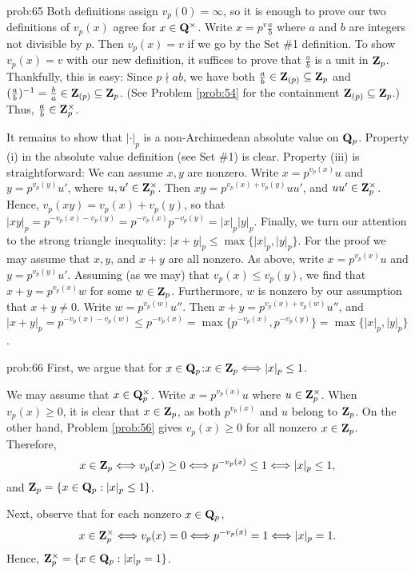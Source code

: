 \begin{sol}{prob:65} Both definitions assign $v_p(0)=\infty$, so it is enough to prove our two definitions of $v_p(x)$ agree for $x \in \mathbf{Q}^{\times}$. Write $x = p^{v} \frac{a}{b}$ where $a$ and $b$ are integers not divisible by $p$. Then $v_p(x)=v$ if we go by the Set \#1 definition. To show $v_p(x)=v$ with our new definition, it suffices to prove that $\frac{a}{b}$ is a unit in $\mathbf{Z}_p$. Thankfully, this is easy: Since $p\nmid ab$, we have both $\frac{a}{b} \in \mathbf{Z}_{(p)} \subseteq \mathbf{Z}_p$ and $(\frac{a}{b})^{-1} = \frac{b}{a} \in \mathbf{Z}_{(p)} \subseteq \mathbf{Z}_p$. (See Problem \ref{prob:54} for the containment $\mathbf{Z}_{(p)}\subseteq \mathbf{Z}_p$.) Thus, $\frac{a}{b} \in \mathbf{Z}_p^{\times}$.

It remains to show that $|\cdot|_p$ is a non-Archimedean absolute value on $\mathbf{Q}_p$. Property (i) in the absolute value definition (see Set \#1) is clear. Property (iii) is straightforward: We can assume $x,y$ are nonzero. Write $x= p^{v_p(x)} u$ and $y=p^{v_p(y)} u'$, where $u, u' \in \mathbf{Z}_p^{\times}$. Then $xy = p^{v_p(x) + v_p(y)} uu'$, and $uu' \in \mathbf{Z}_{p}^{\times}$. Hence, $v_p(xy) = v_p(x)+v_p(y)$, so that $|xy|_{p} = p^{-v_p(x)-v_p(y)}= p^{-v_p(x)} p^{-v_p(y)} = |x|_p|y|_p$. Finally, we turn our attention to the strong triangle inequality: $|x+y|_p \le \max\{|x|_p,|y|_p\}$. For the proof we may assume that $x, y$, and $x+y$ are all nonzero. As above, write $x = p^{v_p(x)} u$ and $y = p^{v_p(y)} u'$. Assuming (as we may) that $v_p(x)\le v_p(y)$, we find that $x+y = p^{v_p(x)} w$ for some $w \in \mathbf{Z}_p$. Furthermore, $w$ is nonzero by our assumption that $x+y\ne 0$. Write $w= p^{v_p(w)} u''$. Then $x+y = p^{v_p(x)+v_p(w)} u''$, and $|x+y|_p = p^{-v_p(x)-v_p(w)} \le p^{-v_p(x)} = \max\{p^{-v_p(x)}, p^{-v_p(y)}\} = \max\{|x|_p, |y|_p\}$.
\end{sol}

\begin{sol}{prob:66} First, we argue that for $x \in \mathbf{Q}_p$:\quad $x \in \mathbf{Z}_p \Longleftrightarrow |x|_p \le 1$. 

We may assume that $x \in \mathbf{Q}_p^{\times}$. Write $x=p^{v_p(x)}u$ where $u \in \mathbf{Z}_{p}^{\times}$. When $v_p(x) \ge 0$, it is clear that $x \in \mathbf{Z}_p$, as both $p^{v_p(x)}$ and $u$ belong to $\mathbf{Z}_p$. On the other hand, Problem \ref{prob:56} gives $v_p(x) \ge 0$ for all nonzero $x \in \mathbf{Z}_p$. Therefore,
\[ x \in \mathbf{Z}_p \Longleftrightarrow v_p(x) \ge 0 \Longleftrightarrow p^{-v_p(x)} \le 1 \Longleftrightarrow |x|_p \le 1,\]
and $\mathbf{Z}_p = \{x\in \mathbf{Q}_p: |x|_p \le 1\}$.

Next, observe that for each nonzero $x \in \mathbf{Q}_p$,
\[ x \in \mathbf{Z}_p^{\times} \Longleftrightarrow v_p(x) = 0 \Longleftrightarrow p^{-v_p(x)}=1 \Longleftrightarrow |x|_p = 1. \]
Hence, $\mathbf{Z}_p^{\times} = \{x \in \mathbf{Q}_p: |x|_p=1\}$. 
\end{sol}


